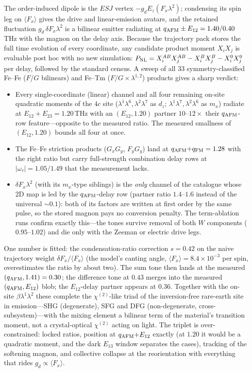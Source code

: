 \documentclass[11pt]{article}
\newcommand{\qafm}{q_{\rm AFM}}
\newcommand{\qfm}{q_{\rm FM}}
\begin{document}
The order-induced dipole is the $ESJ$ vertex
$-g_d E_z(F_x\lambda^2)$; condensing its spin leg on
$\langle F_x\rangle$ gives the drive and linear-emission avatars, and
the retained fluctuation $g_d\,\delta F_x\lambda^2$ is a bilinear
emitter radiating at $\qafm\pm E_{12}=1.40/0.40$\,THz with the magnon
on the delay axis.  Because the trajectory pack stores the full time
evolution of every coordinate, any candidate product moment
$X_iX_j$ is evaluable post hoc with no new simulation:
$P_{\rm NL}=X^{AB}_iX^{AB}_j-X^{B}_iX^{B}_j-X^{0}_iX^{0}_j$ per
delay, followed by the standard census.  A sweep of all $33$
symmetry-classified Fe--Fe ($F$/$G$ bilinears) and Fe--Tm
($F/G\times\lambda^{1,2}$) products gives a sharp verdict:
\begin{itemize}
\item Every single-coordinate (linear) channel and all four remaining
  on-site quadratic moments of the $4c$ site
  ($\lambda^1\lambda^6,\lambda^2\lambda^7$ as $d_z$;
  $\lambda^1\lambda^7,\lambda^2\lambda^6$ as $m_x$) radiate at
  $E_{12}{+}E_{23}=1.20$\,THz with an $(E_{12},1.20)$ partner
  $10$--$12\times$ their $\qafm$-row feature---opposite to the
  measured ratio.  The measured smallness of $(E_{12},1.20)$ bounds
  all four at once.
\item The Fe--Fe striction products ($G_xG_y$, $F_yG_y$) land at
  $\qafm{+}\qfm=1.28$ with the right ratio but carry full-strength
  combination delay rows at $|\omega_\tau|=1.05/1.49$ that the
  measurement lacks.
\item $\delta F_x\lambda^2$ (with its $m_x$-type siblings) is the
  \emph{only} channel of the catalogue whose 2D map is led by the
  $\qafm$-delay row (partner ratio $1.4$--$1.6$ instead of the
  universal $\sim0.1$): both of its factors are written at first
  order by the same pulse, so the stored magnon pays no conversion
  penalty.  The term-ablation runs confirm exactly this---the tones
  survive removal of both $W$ components ($0.95$--$1.02$) and die
  only with the Zeeman or electric drive legs.
\end{itemize}
One number is fitted: the condensation-ratio correction $s=0.42$ on
the naive trajectory weight $\delta F_x/\langle F_x\rangle$ (the
model's canting angle, $\langle F_x\rangle=8.4\times10^{-3}$ per
spin, overestimates the ratio by about two).  The sum tone then lands
at the measured $(\qafm,1.41)=0.30$; the difference tone at $0.43$
merges into the measured $(\qafm,E_{12})$ blob; the $E_{12}$-delay
partner appears at $0.36$.  Together with the on-site
$\beta\lambda^1\lambda^2$ these complete the $\chi^{(2)}$-like triad
of the inversion-free rare-earth site in emission---SHG (degenerate),
SFG and DFG (non-degenerate, cross-subsystem)---with the mixing
element a bilinear term of the material's transition moment, not a
crystal-optical $\chi^{(2)}$ acting on light.  The triplet is
over-constrained: locked ratios, position at $\qafm{+}E_{12}$ exactly
(at $1.20$ it would be a quadratic moment, and the dark $E_{13}$
window separates the cases), tracking of the softening magnon, and
collective collapse at the reorientation with everything that rides
$g_d\propto\langle F_x\rangle$.
\end{document}
